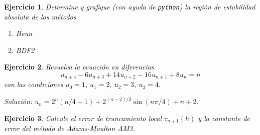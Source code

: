 \documentclass[11pt]{article}
\newtheorem{exercise}{Ejercicio}
\begin{document}
\begin{exercise}
  Determine y grafique (con ayuda de \texttt{python}) la región de
  estabilidad absoluta de los métodos
  \begin{enumerate}
    \item
      Heun
    \item
      BDF2
  \end{enumerate}
\end{exercise}

\begin{exercise}
  Resuelva la ecuación en diferencias
  \begin{equation}
    u_{n+4} - 6u_{n+3} + 14u_{n+2} - 16 u_{n+1} + 8u_{n} = n
  \end{equation}
  con las condiciones $u_0=1$, $u_1=2$, $u_2=3$, $u_3=4$.

  \emph{Solución: $u_n=2^n(n / 4 -1) + 2^{(n-2) / 2}\sin(n\pi /
  4)+n+2$}.
\end{exercise}

\begin{exercise}
  Calcule el error de truncamiento local $\tau_{n+1}(h)$ y la
  constante de error del método de Adams-Moulton AM3.
\end{exercise}
\end{document}
